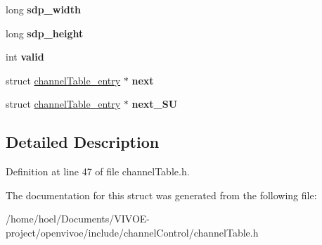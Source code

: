 \begin{DoxyCompactItemize}
\item 
long {\bfseries sdp\+\_\+width}\hypertarget{structchannelTable__entry_aa2aa75a74dce4a30741d56c255d1fb74}{}\label{structchannelTable__entry_aa2aa75a74dce4a30741d56c255d1fb74}

\item 
long {\bfseries sdp\+\_\+height}\hypertarget{structchannelTable__entry_a1672badbd8aeffc88d2198b94d07bae7}{}\label{structchannelTable__entry_a1672badbd8aeffc88d2198b94d07bae7}

\item 
int {\bfseries valid}\hypertarget{structchannelTable__entry_a6e40decbfbbfb291c983857e90b39704}{}\label{structchannelTable__entry_a6e40decbfbbfb291c983857e90b39704}

\item 
struct \hyperlink{structchannelTable__entry}{channel\+Table\+\_\+entry} $\ast$ {\bfseries next}\hypertarget{structchannelTable__entry_a150315d2a41fc63eb04c09edec14c45b}{}\label{structchannelTable__entry_a150315d2a41fc63eb04c09edec14c45b}

\item 
struct \hyperlink{structchannelTable__entry}{channel\+Table\+\_\+entry} $\ast$ {\bfseries next\+\_\+\+SU}\hypertarget{structchannelTable__entry_a76398dc9794d79d4d4dd2c9218d71376}{}\label{structchannelTable__entry_a76398dc9794d79d4d4dd2c9218d71376}

\end{DoxyCompactItemize}


\subsection{Detailed Description}


Definition at line 47 of file channel\+Table.\+h.



The documentation for this struct was generated from the following file\+:\begin{DoxyCompactItemize}
\item 
/home/hoel/\+Documents/\+V\+I\+V\+O\+E-\/project/openvivoe/include/channel\+Control/channel\+Table.\+h\end{DoxyCompactItemize}
